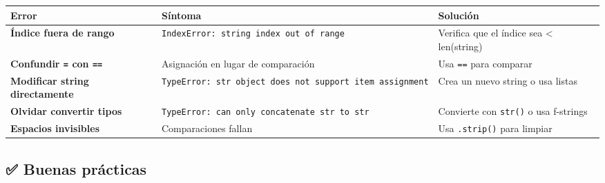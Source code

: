 \documentclass[
  doc,
  floatsintext,
  longtable,
  a4paper,
  nolmodern,
  notxfonts,
  notimes,
  12pt,
  colorlinks=true,linkcolor=blue,citecolor=blue,urlcolor=blue]{apa7}
\newcounter{none} %
\begin{document}
{\def\LTcaptype{none} %
\begin{longtable}[]{@{}
  >{\raggedright\arraybackslash}p{}
  >{\raggedright\arraybackslash}p{}
  >{\raggedright\arraybackslash}p{}@{}}
\toprule\noalign{}
\begin{minipage}[b]{\linewidth}\raggedright
Error
\end{minipage} & \begin{minipage}[b]{\linewidth}\raggedright
Síntoma
\end{minipage} & \begin{minipage}[b]{\linewidth}\raggedright
Solución
\end{minipage} \\
\midrule\noalign{}
\endhead
\bottomrule\noalign{}
\endlastfoot
\textbf{Índice fuera de rango} &
\texttt{IndexError:\ string\ index\ out\ of\ range} & Verifica que el
índice sea \textless{} len(string) \\
\textbf{Confundir \texttt{=} con \texttt{==}} & Asignación en lugar de
comparación & Usa \texttt{==} para comparar \\
\textbf{Modificar string directamente} &
\texttt{TypeError:\ \textquotesingle{}str\textquotesingle{}\ object\ does\ not\ support\ item\ assignment}
& Crea un nuevo string o usa listas \\
\textbf{Olvidar convertir tipos} &
\texttt{TypeError:\ can\ only\ concatenate\ str\ to\ str} & Convierte
con \texttt{str()} o usa f-strings \\
\textbf{Espacios invisibles} & Comparaciones fallan & Usa
\texttt{.strip()} para limpiar \\
\end{longtable}
}

\subsection{✅ Buenas prácticas}\label{buenas-pruxe1cticas}
\end{document}
